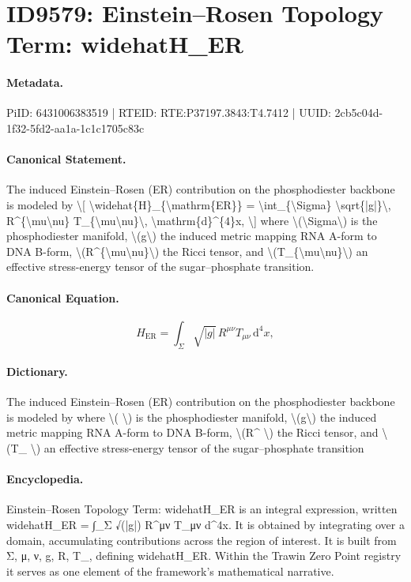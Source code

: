 \section*{ID9579: Einstein–Rosen Topology Term: widehatH\_ER}
\paragraph{Metadata.}
PiID: 6431006383519 | RTEID: RTE:P37197.3843:T4.7412 | UUID: 2cb5c04d-1f32-5fd2-aa1a-1c1c1705c83c

\paragraph{Canonical Statement.}
The induced Einstein--Rosen (ER) contribution on the phosphodiester backbone is modeled by \textbackslash{}[ \textbackslash{}widehat\{H\}\_\{\textbackslash{}mathrm\{ER\}\} = \textbackslash{}int\_\{\textbackslash{}Sigma\} \textbackslash{}sqrt\{|g|\}\textbackslash{}, R\textasciicircum{}\{\textbackslash{}mu\textbackslash{}nu\} T\_\{\textbackslash{}mu\textbackslash{}nu\}\textbackslash{}, \textbackslash{}mathrm\{d\}\textasciicircum{}\{4\}x, \textbackslash{}] where \textbackslash{}(\textbackslash{}Sigma\textbackslash{}) is the phosphodiester manifold, \textbackslash{}(g\textbackslash{}) the induced metric mapping RNA A-form to DNA B-form, \textbackslash{}(R\textasciicircum{}\{\textbackslash{}mu\textbackslash{}nu\}\textbackslash{}) the Ricci tensor, and \textbackslash{}(T\_\{\textbackslash{}mu\textbackslash{}nu\}\textbackslash{}) an effective stress-energy tensor of the sugar--phosphate transition.

\paragraph{Canonical Equation.}
\[
\widehat{H}_{\mathrm{ER}} = \int_{\Sigma} \sqrt{|g|}\, R^{\mu\nu} T_{\mu\nu}\, \mathrm{d}^{4}x,
\]

\paragraph{Dictionary.}
The induced Einstein--Rosen (ER) contribution on the phosphodiester backbone is modeled by where \textbackslash{}( \textbackslash{}) is the phosphodiester manifold, \textbackslash{}(g\textbackslash{}) the induced metric mapping RNA A-form to DNA B-form, \textbackslash{}(R\textasciicircum{} \textbackslash{}) the Ricci tensor, and \textbackslash{}(T\_ \textbackslash{}) an effective stress-energy tensor of the sugar--phosphate transition

\paragraph{Encyclopedia.}
Einstein–Rosen Topology Term: widehatH\_ER is an integral expression, written widehatH\_ER = ∫\_Σ √(|g|) R\textasciicircum{}μν T\_μν d\textasciicircum{}4x. It is obtained by integrating over a domain, accumulating contributions across the region of interest. It is built from Σ, μ, ν, g, R, T\_, defining widehatH\_ER. Within the Trawin Zero Point registry it serves as one element of the framework's mathematical narrative.
